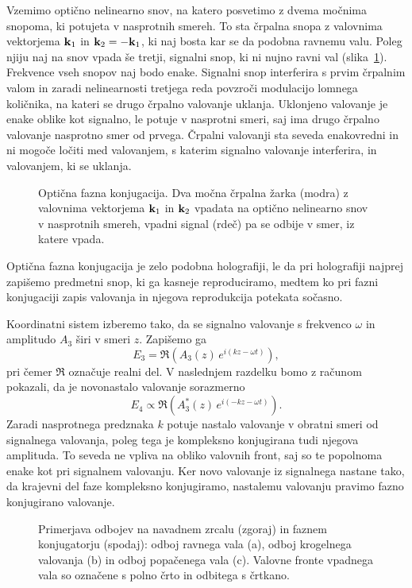 Vzemimo optično nelinearno snov, na katero posvetimo z dvema močnima 
snopoma, ki potujeta v nasprotnih smereh. To sta črpalna snopa z valovnima vektorjema
${\bf k}_{1}$ in ${\bf k}_2 = -{\bf k}_{1}$, ki naj bosta kar se da podobna ravnemu valu. 
Poleg njiju naj na snov vpada
še tretji, signalni snop, ki ni nujno ravni val (slika~\ref{08_OPC1}). 
Frekvence vseh snopov naj bodo enake.
Signalni snop interferira s prvim črpalnim valom in zaradi nelinearnosti 
tretjega reda povzroči modulacijo lomnega količnika, na kateri se
drugo črpalno valovanje uklanja. Uklonjeno valovanje je enake oblike
kot signalno, le potuje v nasprotni smeri, saj ima drugo črpalno valovanje
nasprotno smer od prvega. Črpalni valovanji sta seveda enakovredni in ni
mogoče ločiti med valovanjem, s katerim signalno valovanje interferira, in valovanjem, 
ki se uklanja.

\begin{figure}[h]
\centering
\def\svgwidth{60truemm} 

\caption{Optična fazna konjugacija. Dva močna črpalna žarka (modra) z valovnima
vektorjema ${\bf k}_{1}$ in ${\bf k}_2$ vpadata na optično nelinearno snov v 
nasprotnih smereh, vpadni signal (rdeč) pa se odbije v 
smer, iz katere vpada.}
\label{08_OPC1}
\end{figure}

\begin{remark}Optična fazna konjugacija je zelo podobna holografiji, 
le da pri holografiji najprej zapišemo predmetni snop, ki ga kasneje reproduciramo, 
medtem ko pri fazni konjugaciji zapis valovanja in njegova reprodukcija 
potekata sočasno. 
\end{remark}

Koordinatni sistem izberemo tako, da se signalno valovanje s frekvenco $\omega$ in amplitudo $A_3$
širi v smeri $z$. Zapišemo ga
\begin{equation}
E_{3}=\mathfrak{\Re}\left(A_3\left(z\right)\, e^{i\left(kz-\omega t\right)}\right),
\label{8.97}
\end{equation}
pri čemer $\mathfrak{\Re}$ označuje realni del. 
V naslednjem razdelku bomo z računom pokazali, da je novonastalo valovanje sorazmerno
\begin{equation}
E_{4} \propto \mathfrak{\Re}\left(A_3^{*}\left(z\right)\, e^{i\left(-kz-\omega t\right)}\right).
\label{8.98}
\end{equation}
Zaradi nasprotnega predznaka $k$ potuje nastalo valovanje v obratni smeri od signalnega
valovanja, poleg tega je kompleksno konjugirana tudi njegova amplituda. To seveda
ne vpliva na obliko valovnih front, saj so te popolnoma enake kot pri signalnem
valovanju. Ker novo valovanje iz signalnega nastane tako,
da krajevni del faze kompleksno konjugiramo, nastalemu valovanju pravimo fazno
konjugirano valovanje.
\begin{figure}[h!]
\centering
\def\svgwidth{100truemm} 

\caption{Primerjava odbojev na navadnem zrcalu (zgoraj) in faznem konjugatorju (spodaj): odboj ravnega
vala (a), odboj krogelnega valovanja (b) in odboj popačenega vala (c). Valovne fronte 
vpadnega vala so označene s polno črto in odbitega s črtkano.}
\label{08_OPC2}
\end{figure}

